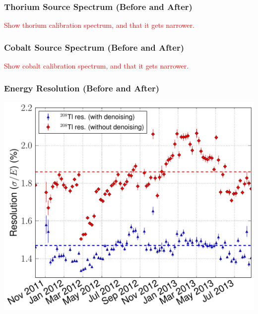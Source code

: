 \documentclass{beamer}
\begin{document}
\begin{frame}
\begin{center}
\frametitle{Thorium Source Spectrum (Before and After)}
\end{center}
\textcolor{red}{Show thorium calibration spectrum, and that it gets narrower.}
\end{frame}

\begin{frame}
\begin{center}
\frametitle{Cobalt Source Spectrum (Before and After)}
\end{center}
\textcolor{red}{Show cobalt calibration spectrum, and that it gets narrower.}
\end{frame}

\begin{frame}
\begin{center}
\frametitle{Energy Resolution (Before and After)}
\end{center}
\vspace{0.6cm}
\begin{center}
\includegraphics[keepaspectratio=true,width=.95\textwidth]{RotatedReso_denoised_compVsTime.pdf}
\end{center}
\end{frame}
\end{document}
